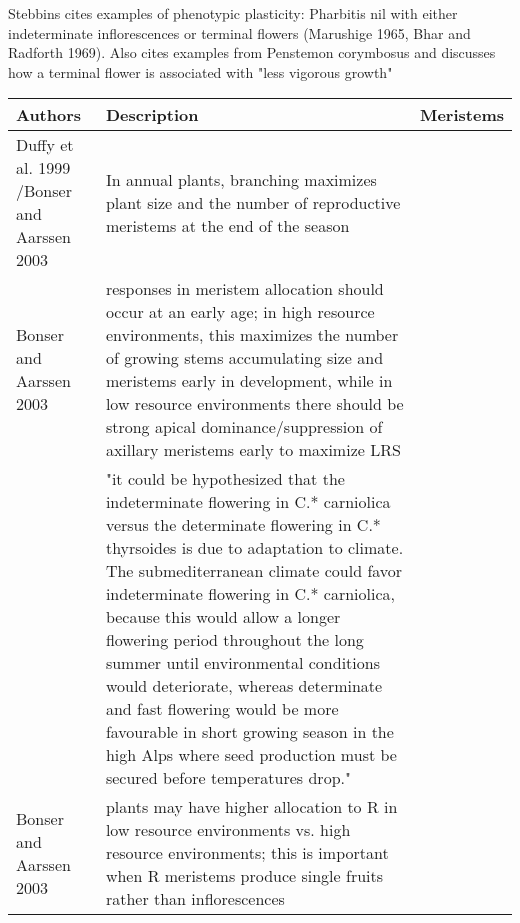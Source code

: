 \documentclass[12pt, oneside]{article}   	%
\begin{document}
Stebbins cites examples of phenotypic  plasticity: Pharbitis nil with either indeterminate inflorescences or terminal flowers (Marushige 1965, Bhar and Radforth 1969). Also cites examples from Penstemon corymbosus and discusses how a terminal flower is associated with "less vigorous growth"

\begin{tabularx}{\textwidth}{|l| >{\setlength{\baselineskip}{.5\baselineskip}}X|l|}
\hline
Authors & Description & Meristems \\ \hline
  \cite{} Duffy et al. 1999 /Bonser and Aarssen 2003     &In annual plants, branching maximizes plant size and the number of reproductive meristems at the end of the season &           \\ \hline
  \cite{} Bonser and Aarssen 2003   & responses in meristem allocation should occur at an early age; in high resource environments, this maximizes the number of growing stems accumulating size and meristems early in development, while in low resource environments there should be strong apical dominance/suppression of axillary meristems early to maximize LRS &           \\ \hline
   \cite{scheepens2011}       &  "it could be hypothesized that the indeterminate flowering in C.* carniolica versus the determinate flowering in C.* thyrsoides is due to adaptation to climate. The submediterranean climate could favor indeterminate flowering in C.* carniolica, because this would allow a longer flowering period throughout the long summer until environmental conditions would deteriorate, whereas determinate and fast flowering would be more favourable in short growing season in the high Alps where seed production must be secured before temperatures drop."
  &           \\ \hline
  \cite{} Bonser and Aarssen 2003   & plants may have higher allocation to R in low resource environments vs. high resource environments; this is important when R meristems produce single fruits rather than  inflorescences &           \\ \hline
 \end{tabularx}
 
\end{document}
